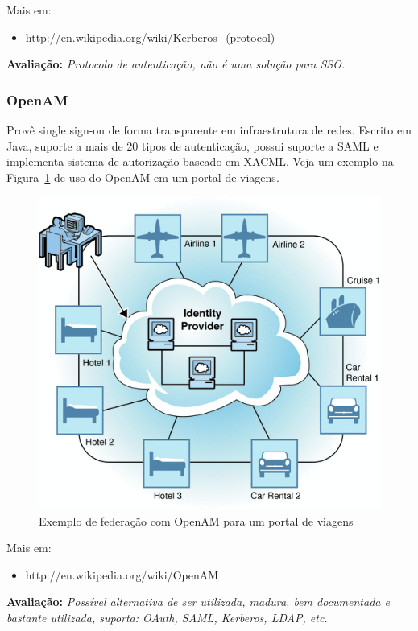 \documentclass[11pt]{article}
\begin{document}
Mais em:
\begin{itemize}
  \item{http://en.wikipedia.org/wiki/Kerberos\_(protocol)}
\end{itemize}

{\bf Avaliação:} {\it Protocolo de autenticação, não é uma solução para SSO.}

\subsubsection{OpenAM}

Provê single sign-on de forma transparente em infraestrutura de redes. Escrito
em Java, suporte a mais de 20 tipos de autenticação, possui suporte a SAML e
implementa sistema de autorização baseado em XACML. Veja um exemplo na
Figura~\ref{fig:opensso} de uso do OpenAM em um portal de viagens.

\begin{figure}[h]
\center
\includegraphics[scale=0.5]{opensso.png}
\caption{Exemplo de federação com OpenAM para um portal de viagens}
\label{fig:opensso}
\end{figure}

Mais em:
\begin{itemize}
  \item{http://en.wikipedia.org/wiki/OpenAM}
\end{itemize}

{\bf Avaliação:} {\it Possível alternativa de ser utilizada, madura, bem
documentada e bastante utilizada, suporta: OAuth, SAML, Kerberos, LDAP, etc.}
\end{document}
